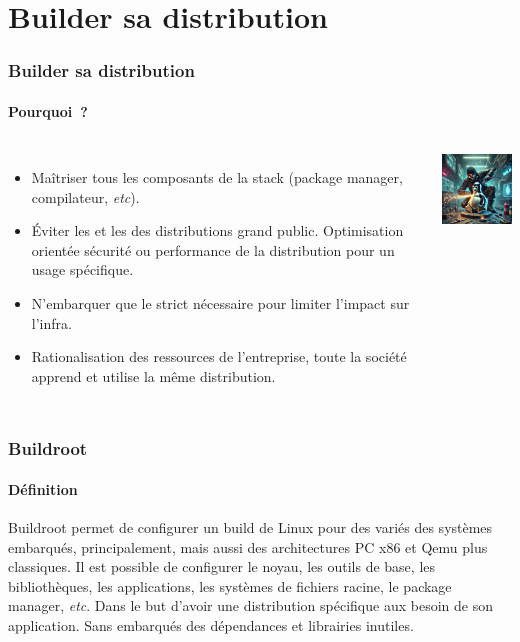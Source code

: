\documentclass{beamer}
\begin{document}
    \section{Builder sa distribution}\label{sec:build-distribution}
    \begin{frame}
        \transdissolve
        \frametitle{Builder sa distribution}
        \framesubtitle{Pourquoi~?}
        \begin{columns}
            \begin{itemize}
                \item Maîtriser tous les composants de la stack (package manager, compilateur, \textit{etc}).
                \item Éviter les  et les  des distributions grand public.
                Optimisation orientée sécurité ou performance de la distribution pour un usage spécifique.
                \item N'embarquer que le strict nécessaire pour limiter l'impact sur l'infra.
                \item Rationalisation des ressources de l'entreprise, toute la société apprend et utilise la même distribution.
            \end{itemize}
            \centering
            \includegraphics[width=4cm]{image/building-linux}
        \end{columns}
    \end{frame}

    \begin{frame}
        \transdissolve
        \frametitle{Buildroot}
        \framesubtitle{Définition}
        Buildroot permet de configurer un build de Linux pour des  variés des systèmes embarqués, principalement, mais aussi des architectures PC x86 et Qemu plus classiques.
        \bigbreak
        Il est possible de configurer le noyau, les outils de base, les bibliothèques, les applications, les systèmes de fichiers racine, le package manager, \textit{etc}.
        Dans le but d'avoir une distribution spécifique aux besoin de son application.
        Sans embarqués des dépendances et librairies inutiles.
    \end{frame}
\end{document}
